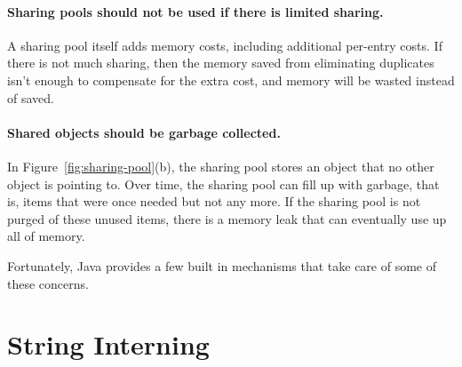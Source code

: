\paragraph{Sharing pools should not be used if there is limited sharing.}
A sharing pool itself adds
memory costs, including additional per-entry costs. If there is not
much sharing, then the memory saved from
eliminating duplicates isn't enough to compensate for the
extra cost, and memory will be wasted instead of saved.


\paragraph{Shared objects should be garbage collected.}
In Figure~\ref{fig:sharing-pool}(b), the sharing pool stores an object
that no other object is pointing to. Over time, the sharing pool can fill up
with garbage, that is, items that were once needed but not any more. If the
sharing pool is not purged of these unused items, there is a memory
leak that can eventually use up all of memory.

Fortunately, Java provides a few built in mechanisms that take care of some of
these concerns.

\section{String Interning}
\label{sec:sharing-strings}


